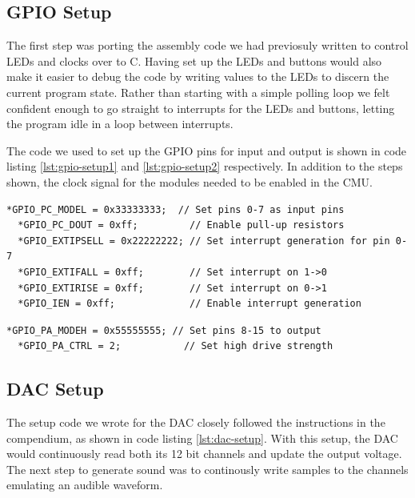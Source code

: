 \subsection{GPIO Setup} 
The first step was porting the assembly code we had previosuly written to control LEDs and clocks over to C. Having set up the LEDs and buttons would also make it easier to debug the code by writing values to the LEDs to discern the current program state. Rather than starting with a simple polling loop we felt confident enough to go straight to interrupts for the LEDs and buttons, letting the program idle in a loop between interrupts.

The code we used to set up the GPIO pins for input and output is shown in code listing \ref{lst:gpio-setup1} and \ref{lst:gpio-setup2} respectively. In addition to the steps shown, the clock signal for the modules needed to be enabled in the CMU. \\

\noindent\begin{minipage}[pos=c,contentpos=c]{\textwidth}
  \begin{lstlisting}[caption=Setting GPIO pins 0-7 as input,label={lst:gpio-setup1}]
  *GPIO_PC_MODEL = 0x33333333;  // Set pins 0-7 as input pins
  *GPIO_PC_DOUT = 0xff;         // Enable pull-up resistors
  *GPIO_EXTIPSELL = 0x22222222; // Set interrupt generation for pin 0-7
  *GPIO_EXTIFALL = 0xff;        // Set interrupt on 1->0
  *GPIO_EXTIRISE = 0xff;        // Set interrupt on 0->1
  *GPIO_IEN = 0xff;             // Enable interrupt generation
  \end{lstlisting}
\end{minipage}

\noindent\begin{minipage}[c]{\textwidth}
  \begin{lstlisting}[caption=Setting GPIO pins 8-15 as output,label={lst:gpio-setup2}]
  *GPIO_PA_MODEH = 0x55555555; // Set pins 8-15 to output
  *GPIO_PA_CTRL = 2;           // Set high drive strength
  \end{lstlisting}
\end{minipage}


\subsection{DAC Setup}
The setup code we wrote for the DAC closely followed the instructions in the compendium, as shown in code listing \ref{lst:dac-setup}. With this setup, the DAC would continuously read both its 12 bit channels and update the output voltage. The next step to generate sound was to continously write samples to the channels emulating an audible waveform.\\

